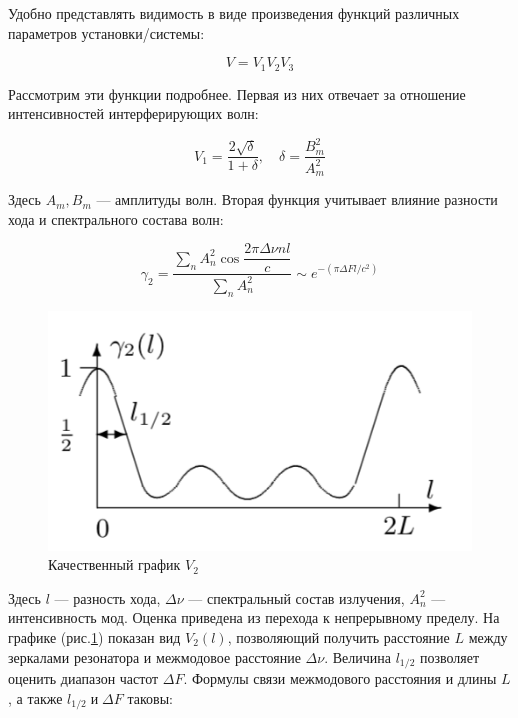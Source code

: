 \documentclass[a4paper,12pt]{article} %
\begin{document}
Удобно представлять видимость в виде произведения функций различных параметров установки/системы:

\begin{equation}\label{VVV}
V = V_1 V_2 V_3
\end{equation}

Рассмотрим эти функции подробнее. Первая из них отвечает за отношение интенсивностей интерферирующих волн:

\begin{equation}\label{V1}
V_1 = \dfrac{2\sqrt{\delta}}{1 + \delta}, \quad \delta = \dfrac{B_m^2}{A_m^2}
\end{equation}


Здесь $ A_m, B_m $ --- амплитуды волн. Вторая функция учитывает влияние разности хода и спектрального состава волн:


\begin{equation}\label{}
\gamma_2 = \dfrac{\sum\limits_n A_n^2 \cos{\dfrac{2\pi \Delta \nu n l}{c}}}{\sum\limits_n A_n^2} \sim e^{-(\pi \Delta F l /c^2)}
\end{equation}

\begin{figure} 
	\includegraphics[width=\linewidth]{v2.png}
	\caption{Качественный график $ V_2 $}
	\label{V2graf}
\end{figure}


Здесь $ l $ --- разность хода, $ \Delta\nu $ --- спектральный состав излучения, $ A_n^2 $ --- интенсивность мод. Оценка приведена из перехода к непрерывному пределу. На графике (рис.\ref{V2graf}) показан вид $ V_2(l) $, позволяющий получить расстояние $ L $ между зеркалами резонатора и межмодовое расстояние $ \Delta \nu $. Величина $ l_{1/2} $  позволяет оценить диапазон частот $ \Delta F $.
Формулы связи межмодового расстояния и длины $ L $, а также $ l_{1/2} \; \text{и} \; \Delta F $ таковы:
\end{document}
